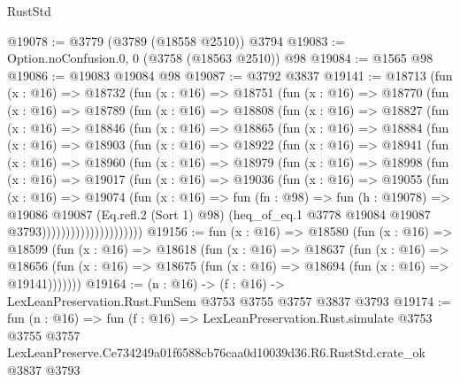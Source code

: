 \begin{lexlean}{RustStd}
\begin{coremodule}
@19078 := @3779 (@3789 (@18558 @2510)) @3794
@19083 := Option.noConfusion.{0, 0} (@3758 (@18563 @2510)) @98
@19084 := @1565 @98
@19086 := @19083 @19084 @98
@19087 := @3792 @3837
@19141 := @18713
    (fun (x : @16) =>
    @18732
      (fun (x : @16) =>
      @18751
        (fun (x : @16) =>
        @18770
          (fun (x : @16) =>
          @18789
            (fun (x : @16) =>
            @18808
              (fun (x : @16) =>
              @18827
                (fun (x : @16) =>
                @18846
                  (fun (x : @16) =>
                  @18865
                    (fun (x : @16) =>
                    @18884
                      (fun (x : @16) =>
                      @18903
                        (fun (x : @16) =>
                        @18922
                          (fun (x : @16) =>
                          @18941
                            (fun (x : @16) =>
                            @18960
                              (fun (x : @16) =>
                              @18979
                                (fun (x : @16) =>
                                @18998
                                  (fun (x : @16) =>
                                  @19017
                                    (fun (x : @16) =>
                                    @19036
                                      (fun (x : @16) =>
                                      @19055
                                        (fun (x : @16) =>
                                        @19074
                                          (fun (x : @16) =>
                                          fun (fn : @98) =>
                                          fun (h : @19078) =>
                                          @19086
                                            @19087
                                            (Eq.refl.{2} (Sort 1) @98)
                                            (heq_of_eq.{1}
                                              @3778
                                              @19084
                                              @19087
                                              @3793)))))))))))))))))))))
@19156 := fun (x : @16) =>
  @18580
    (fun (x : @16) =>
    @18599
      (fun (x : @16) =>
      @18618
        (fun (x : @16) =>
        @18637
          (fun (x : @16) =>
          @18656 (fun (x : @16) => @18675 (fun (x : @16) => @18694 (fun (x : @16) => @19141)))))))
@19164 := (n : @16) -> (f : @16) -> LexLeanPreservation.Rust.FunSem @3753 @3755 @3757 @3837 @3793
@19174 := fun (n : @16) =>
  fun (f : @16) =>
  LexLeanPreservation.Rust.simulate
    @3753
    @3755
    @3757
    LexLeanPreserve.Ce734249a01f6588cb76caa0d10039d36.R6.RustStd.crate_ok
    @3837
    @3793
\end{coremodule}
\end{lexlean}
